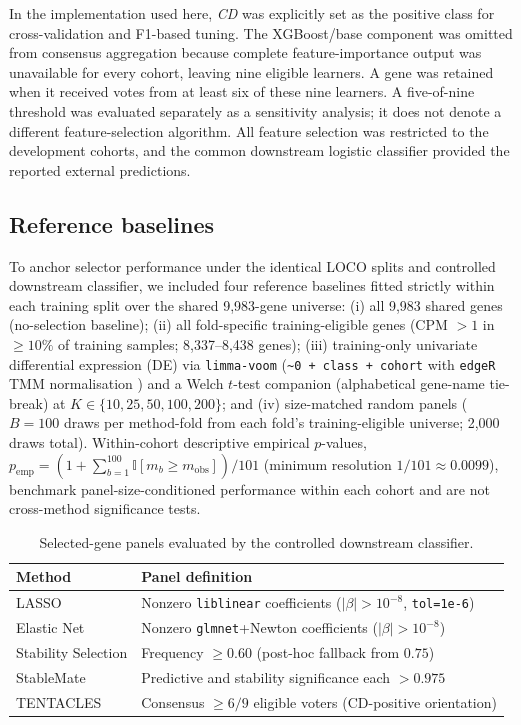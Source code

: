 In the implementation used here, \emph{CD} was explicitly set as the positive class for cross-validation and F1-based tuning. The XGBoost/base component was omitted from consensus aggregation because complete feature-importance output was unavailable for every cohort, leaving nine eligible learners. A gene was retained when it received votes from at least six of these nine learners. A five-of-nine threshold was evaluated separately as a sensitivity analysis; it does not denote a different feature-selection algorithm. All feature selection was restricted to the development cohorts, and the common downstream logistic classifier provided the reported external predictions.

\subsection{Reference baselines}
\label{sec:baselines}
To anchor selector performance under the identical LOCO splits and controlled downstream classifier, we included four reference baselines fitted strictly within each training split over the shared 9,983-gene universe: (i) all 9,983 shared genes (no-selection baseline); (ii) all fold-specific training-eligible genes (CPM $>1$ in $\ge 10\%$ of training samples; 8,337--8,438 genes); (iii) training-only univariate differential expression (DE) via \texttt{limma-voom} \cite{law2014voom} (\texttt{\textasciitilde 0 + class + cohort} with \texttt{edgeR} TMM normalisation \cite{robinson2010edger}) and a Welch $t$-test companion (alphabetical gene-name tie-break) at $K\in\{10,25,50,100,200\}$; and (iv) size-matched random panels ($B=100$ draws per method-fold from each fold's training-eligible universe; 2,000 draws total). Within-cohort descriptive empirical $p$-values, $p_{\mathrm{emp}}=(1+\sum_{b=1}^{100}\mathbb{I}[m_b \ge m_{\mathrm{obs}}])/101$ (minimum resolution $1/101 \approx 0.0099$), benchmark panel-size-conditioned performance within each cohort and are not cross-method significance tests.

\begin{table}[!t]
\caption{Selected-gene panels evaluated by the controlled downstream classifier.}
\label{tab:method_overview}
\centering\footnotesize
\setlength{\tabcolsep}{3pt}
\renewcommand{\arraystretch}{1.12}
\begin{tabular}{@{}p{2.2cm}p{5.7cm}@{}}
\toprule
Method & Panel definition \\
\midrule
LASSO & Nonzero \texttt{liblinear} coefficients ($|\beta|>10^{-8}$, \texttt{tol=1e-6}) \\
Elastic Net & Nonzero \texttt{glmnet}+Newton coefficients ($|\beta|>10^{-8}$) \\
Stability Selection & Frequency $\geq 0.60$ (post-hoc fallback from $0.75$) \\
StableMate & Predictive and stability significance each $>0.975$ \\
TENTACLES & Consensus $\ge 6/9$ eligible voters (CD-positive orientation) \\
\bottomrule
\end{tabular}
\end{table}
